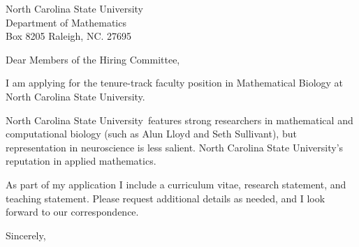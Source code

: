 \documentclass[11pt,a4paper]{letter}
\begin{document}
\def\School{North Carolina State University}
\begin{letter}
{North Carolina State University\\
Department of Mathematics\\
Box 8205 Raleigh, NC. 27695}


\opening{Dear Members of the Hiring Committee,}

I am applying for the tenure-track faculty position in Mathematical Biology at \School. 



\School~features strong researchers in mathematical and computational biology (such as Alun Lloyd and Seth Sullivant), but representation in neuroscience is less salient. \School's reputation in applied mathematics.



As part of my application I include a curriculum vitae, research statement, and teaching statement. Please request additional details as needed, and I look forward to our correspondence.

\closing{Sincerely,}
\end{letter}
\end{document}
